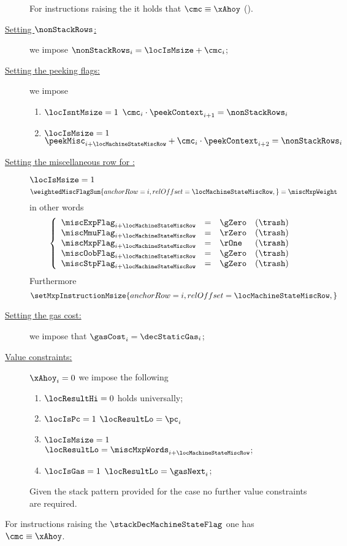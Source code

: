 \begin{description}
		\saNote{}
		For instructions raising the \machineStateFlag{} it holds that
		$\cmc \equiv \xAhoy$ (\trash).
	\item[\underline{Setting $\nonStackRows$:}]
		we impose $\nonStackRows_{i} = \locIsMsize + \cmc_{i}$;
	\item[\underline{Setting the peeking flags:}]
		we impose
		\begin{enumerate}
			\item \If $\locIsntMsize = 1$ \Then $\cmc_{i} \cdot \peekContext_{i + 1} = \nonStackRows_{i}$
			\item \If $\locIsMsize   = 1$ \Then $\peekMisc_{i + \locMachineStateMiscRow} + \cmc_{i} \cdot \peekContext_{i + 2} = \nonStackRows_{i}$
		\end{enumerate}
	\item[\underline{Setting the miscellaneous row for \inst{MSIZE}:}]
		\If $\locIsMsize = 1$ \Then
		\[
			\weightedMiscFlagSum {
				anchorRow = i                       ,
				relOffset = \locMachineStateMiscRow ,
			}
			=
			\miscMxpWeight
		\]
		in other words
		\[
			\left\{ \begin{array}{lclr}
				\miscExpFlag_{i + \locMachineStateMiscRow} & = & \gZero  & (\trash) \\
				\miscMmuFlag_{i + \locMachineStateMiscRow} & = & \rZero  & (\trash) \\
				\miscMxpFlag_{i + \locMachineStateMiscRow} & = & \rOne   & (\trash) \\
				\miscOobFlag_{i + \locMachineStateMiscRow} & = & \gZero  & (\trash) \\
				\miscStpFlag_{i + \locMachineStateMiscRow} & = & \gZero  & (\trash) \\
			\end{array} \right.
		\]
		Furthermore
		\[
			\setMxpInstructionMsize {
				anchorRow = i                       ,
				relOffset = \locMachineStateMiscRow ,
			}
		\]
	\item[\underline{Setting the gas cost:}]
		we impose that $\gasCost_{i} = \decStaticGas_{i}$;
	\item[\underline{Value constraints:}]
		\If $\xAhoy_{i} = 0$ \Then we impose the following
		\begin{enumerate}
			\item $\locResultHi = 0$ holds universally;
			\item
				\If $\locIsPc = 1$
				\Then $\locResultLo = \pc_{i}$
			\item
				\If $\locIsMsize = 1$
				\Then $\locResultLo = \miscMxpWords_{i + \locMachineStateMiscRow}$;
			\item
				\If $\locIsGas = 1$
				\Then $\locResultLo = \gasNext_{i}$;
		\end{enumerate}
		\saNote{}
		Given the stack pattern provided for the  case no further value constraints are required.
\end{description}
\saNote{} For instructions raising the $\stackDecMachineStateFlag$ one has $\cmc \equiv \xAhoy$.
